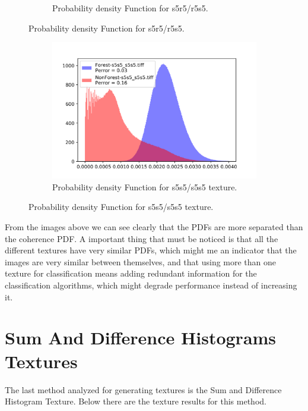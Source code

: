 \begin{figure}[H]
\begin{subfigure}[b]{0.4\linewidth}
     \caption{Probability density Function for s5r5/r5s5.}
  \end{subfigure}
\end{figure}

\newpage
\begin{figure}[H]
  \centering
  \begin{subfigure}[b]{0.4\linewidth}
    \includegraphics[width=\linewidth]{Chapter4/laws_textures/s5s5_s5s5.png}
     \caption{Probability density Function for s5s5/s5s5 texture.}
  \end{subfigure}
\end{figure}




From the images above we can see clearly that the PDFs are more separated than the coherence PDF. A important thing that must be noticed is that all the different textures have very similar PDFs, which might me an indicator that the images are very similar between themselves, and that using more than one texture for classification means adding redundant information for the classification algorithms, which might degrade performance instead of increasing it.

\section{Sum And Difference Histograms Textures}
\label{sec:sum_and_diff_hist_textures}
The last method analyzed for generating textures is the Sum and Difference Histogram Texture. Below there are the texture results for this method.

